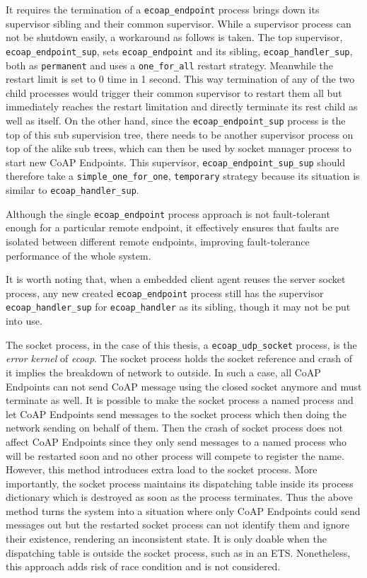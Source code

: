 It requires the termination of a \verb|ecoap_endpoint| process brings down its supervisor sibling and their common supervisor. While a supervisor process can not be shutdown easily, a workaround as follows is taken. The top supervisor, \verb|ecoap_endpoint_sup|, sets \verb|ecoap_endpoint| and its sibling, \verb|ecoap_handler_sup|, both as \verb|permanent| and uses a \verb|one_for_all| restart strategy. Meanwhile the restart limit is set to 0 time in 1 second. This way termination of any of the two child processes would trigger their common supervisor to restart them all but immediately reaches the restart limitation and directly terminate its rest child as well as itself. On the other hand, since the \verb|ecoap_endpoint_sup| process is the top of this sub supervision tree, there needs to be another supervisor process on top of the alike sub trees, which can then be used by socket manager process to start new CoAP Endpoints. This supervisor, \verb|ecoap_endpoint_sup_sup| should therefore take a \verb|simple_one_for_one|, \verb|temporary| strategy because its situation is similar to \verb|ecoap_handler_sup|. 

Although the single \verb|ecoap_endpoint| process approach is not fault-tolerant enough for a particular remote endpoint, it effectively ensures that faults are isolated between different remote endpoints, improving fault-tolerance performance of the whole system. 

It is worth noting that, when a embedded client agent reuses the server socket process, any new created \verb|ecoap_endpoint| process still has the supervisor \verb|ecoap_handler_sup| for \verb|ecoap_handler| as its sibling, though it may not be put into use. 

The socket process, in the case of this thesis, a \verb|ecoap_udp_socket| process, is the \textit{error kernel} of \textit{ecoap}. The socket process holds the socket reference and crash of it implies the breakdown of network to outside. In such a case, all CoAP Endpoints can not send CoAP message using the closed socket anymore and must terminate as well. It is possible to make the socket process a named process and let CoAP Endpoints send messages to the socket process which then doing the network sending on behalf of them. Then the crash of socket process does not affect CoAP Endpoints since they only send messages to a named process who will be restarted soon and no other process will compete to register the name. However, this method introduces extra load to the socket process. More importantly, the socket process maintains its dispatching table inside its process dictionary which is destroyed as soon as the process terminates. Thus the above method turns the system into a situation where only CoAP Endpoints could send messages out but the restarted socket process can not identify them and ignore their existence, rendering an inconsistent state. It is only doable when the dispatching table is outside the socket process, such as in an ETS. Nonetheless, this approach adds risk of race condition and is not considered. 

